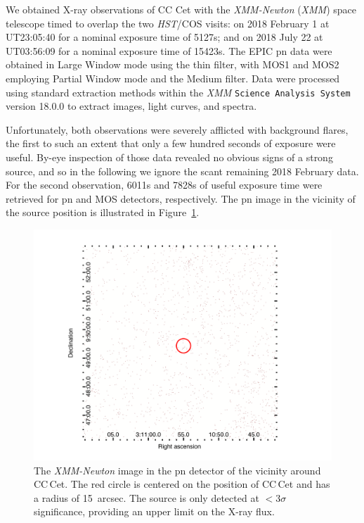 \documentclass[fleqn,usenatbib]{mnras}
\begin{document}
We obtained X-ray observations of CC Cet with the {\em XMM-Newton} (\textit{XMM}) space telescope timed to overlap the two \textit{HST}/COS visits: on 2018 February 1 at UT23:05:40 for a nominal exposure time of 5127s; and on 2018 July 22 at UT03:56:09 for a nominal exposure time of 15423s. The EPIC pn data were obtained in Large Window mode using the thin filter, with MOS1 and MOS2 employing Partial Window mode and the Medium filter. Data were processed using standard extraction methods within the \textit{XMM} {\tt Science Analysis System} version 18.0.0 to extract images, light curves, and spectra.  

Unfortunately, both observations were severely afflicted with background flares, the first to such an extent that only a few hundred seconds of exposure were useful.  By-eye inspection of those data revealed no obvious signs of a strong source, and so in the following we ignore the scant remaining 2018 February data. For the second observation, 6011s and 7828s of useful exposure time were retrieved for pn and MOS detectors, respectively. The pn image in the vicinity of the source position is illustrated in Figure~\ref{f:pn}.

\begin{figure}
    \centering
    \includegraphics[width=\columnwidth]{ds9.pdf}
    \caption{The {\it XMM-Newton} image in the pn detector of the vicinity around CC\,Cet. The red circle is centered on the position of CC\,Cet and has a radius of 15~arcsec. The source is only detected at $<3\sigma$ significance, providing an upper limit on the X-ray flux.}  
    \label{f:pn}
\end{figure}
\end{document}
